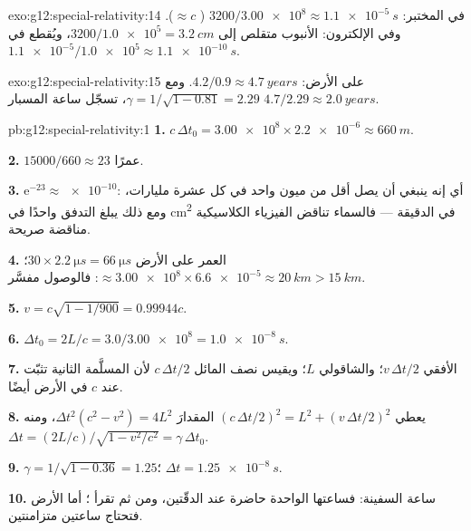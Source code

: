 \begin{solution}{exo:g12:special-relativity:14}
في المختبر: $3200/\num{3.00e8} \approx \qty{1.1e-5}{s}$ (
$\approx c$). وفي  الإلكترون: الأنبوب متقلص إلى
$3200/\num{1.0e5} = \qty{3.2}{cm}$، ويُقطع في
$\num{1.1e-5}/\num{1.0e5} \approx \qty{1.1e-10}{s}$.
\end{solution}

\begin{solution}{exo:g12:special-relativity:15}
على الأرض: $4.2/0.9 \approx \qty{4.7}{years}$. ومع
$\gamma = 1/\sqrt{1 - 0.81} = 2.29$، تسجّل ساعة المسبار
$4.7/2.29 \approx \qty{2.0}{years}$.
\end{solution}

\begin{solution}{pb:g12:special-relativity:1}
\textbf{1.} $c\,\Delta t_0 = \num{3.00e8} \times \num{2.2e-6} \approx
\qty{660}{m}$.

\textbf{2.} $\num{15000}/660 \approx 23$ عمرًا.

\textbf{3.} $\mathrm{e}^{-23} \approx \num{e-10}$: أي إنه ينبغي أن يصل أقل من ميون واحد
في كل عشرة مليارات، ومع ذلك يبلغ التدفق واحدًا في \unit{cm^2} في
الدقيقة --- فالسماء تناقض الفيزياء الكلاسيكية مناقضة صريحة.

\textbf{4.} العمر على الأرض $30 \times \qty{2.2}{\micro s} =
\qty{66}{\micro s}$؛  $\approx \num{3.00e8} \times \num{6.6e-5}
\approx \qty{20}{km} > \qty{15}{km}$: فالوصول مفسَّر.

\textbf{5.} $v = c\sqrt{1 - 1/900} = 0.99944c$.

\textbf{6.} $\Delta t_0 = 2L/c = 3.0/\num{3.00e8} = \qty{1.0e-8}{s}$.

\textbf{7.} الأفقي $v\,\Delta t/2$؛ والشاقولي $L$؛ ويقيس نصف 
المائل $c\,\Delta t/2$ لأن المسلَّمة الثانية تثبّت
  عند $c$ في  الأرض أيضًا.

\textbf{8.} يعطي $(c\,\Delta t/2)^2 = L^2 + (v\,\Delta t/2)^2$ المقدارَ
$\Delta t^2(c^2 - v^2) = 4L^2$، ومنه $\Delta t =
(2L/c)/\sqrt{1 - v^2/c^2} = \gamma\,\Delta t_0$.

\textbf{9.} $\gamma = 1/\sqrt{1 - 0.36} = 1.25$؛
$\Delta t = \qty{1.25e-8}{s}$.

\textbf{10.} ساعة السفينة: فساعتها الواحدة حاضرة عند الدقّتين، ومن ثم
تقرأ ؛ أما الأرض فتحتاج ساعتين متزامنتين.


\end{solution}
